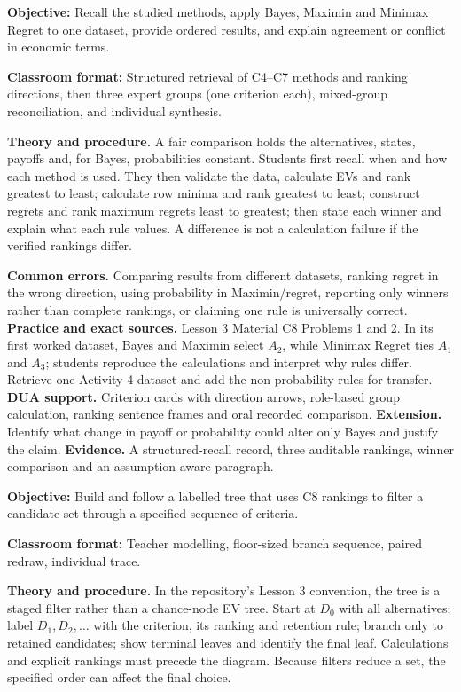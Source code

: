 \documentclass[10pt,letterpaper]{article}
\newcommand{\labelled}[2]{\textbf{#1:} #2\par}
\newcommand{\partheading}[1]{\Needspace{6\baselineskip}\par\vspace{5pt}{\bfseries #1\par}\vspace{1pt}}
\begin{document}
	\vspace{5pt}
	\begin{bluebox}
		\fontsize{8.35}{10.55}\selectfont
		\partheading{Part 1---Structured Recall and C8: Compare Methods and Rank Alternatives}
		\labelled{Objective}{Recall the studied methods, apply Bayes, Maximin and Minimax Regret to one dataset, provide ordered results, and explain agreement or conflict in economic terms.}
		\labelled{Classroom format}{Structured retrieval of C4--C7 methods and ranking directions, then three expert groups (one criterion each), mixed-group reconciliation, and individual synthesis.}
		\textbf{Theory and procedure.} A fair comparison holds the alternatives,
		states, payoffs and, for Bayes, probabilities constant. Students first recall
		when and how each method is used. They then validate the data, calculate EVs
		and rank greatest to least; calculate row minima and rank greatest to least;
		construct regrets and rank maximum regrets least to greatest; then state each
		winner and explain what each rule values. A difference is not a calculation
		failure if the verified rankings differ.
		
		\textbf{Common errors.} Comparing results from different datasets, ranking
		regret in the wrong direction, using probability in Maximin/regret, reporting
		only winners rather than complete rankings, or claiming one rule is universally
		correct. \textbf{Practice and exact sources.} Lesson 3 Material C8 Problems 1
		and 2. In its first worked dataset, Bayes and Maximin select $A_2$, while
		Minimax Regret ties $A_1$ and $A_3$; students reproduce the calculations and
		interpret why rules differ. Retrieve one Activity 4 dataset and add the
		non-probability rules for transfer. \textbf{DUA support.} Criterion cards with
		direction arrows, role-based group calculation, ranking sentence frames and
		oral recorded comparison. \textbf{Extension.} Identify what change in payoff
		or probability could alter only Bayes and justify the claim. \textbf{Evidence.}
		A structured-recall record, three auditable rankings, winner comparison and an
		assumption-aware paragraph.
		
		\partheading{Part 2---C9: Use Rankings in a Staged Decision Tree}
		\labelled{Objective}{Build and follow a labelled tree that uses C8 rankings to filter a candidate set through a specified sequence of criteria.}
		\labelled{Classroom format}{Teacher modelling, floor-sized branch sequence, paired redraw, individual trace.}
		\textbf{Theory and procedure.} In the repository's Lesson 3 convention, the
		tree is a staged filter rather than a chance-node EV tree. Start at $D_0$ with
		all alternatives; label $D_1,D_2,\ldots$ with the criterion, its ranking and
		retention rule; branch only to retained candidates; show terminal leaves and
		identify the final leaf. Calculations and explicit rankings must precede the
		diagram. Because filters reduce a set, the specified order can affect the final
		choice.
		

\end{bluebox}
\end{document}
